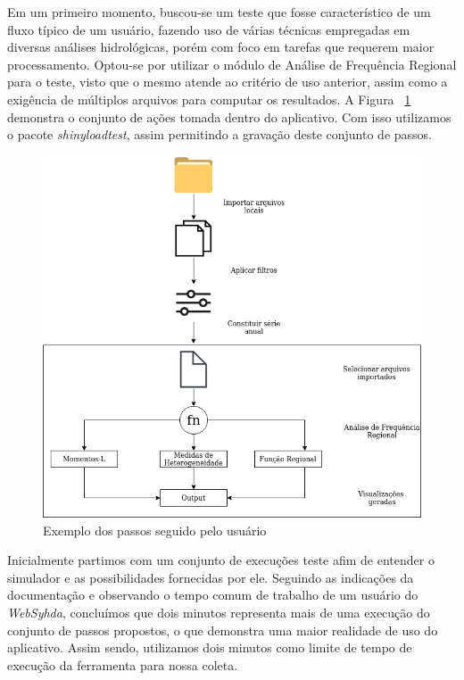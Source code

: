 \documentclass[12pt,english,brazil]{article}
\begin{document}
Em um primeiro momento, buscou-se um teste que fosse característico de um fluxo típico de um usuário, fazendo uso de várias técnicas empregadas em diversas análises hidrológicas, porém com foco em tarefas que requerem maior processamento. Optou-se por utilizar o módulo de Análise de Frequência Regional para o teste, visto que o mesmo atende ao critério de uso anterior, assim como a exigência de múltiplos arquivos para computar os resultados. A Figura ~\ref{usoWebSyhda} demonstra o conjunto de ações tomada dentro do aplicativo. Com isso utilizamos o pacote \emph{shinyloadtest}, assim permitindo a gravação deste conjunto de passos. 

\begin{figure}[htbp]
  \centering 
  \includegraphics[scale=.4]{paperWSCAD2021/figures/useWebSyhdaDrawio.png}
  \caption{Exemplo dos passos seguido pelo usuário}
  \label{usoWebSyhda}
\end{figure}

Inicialmente partimos com um conjunto de execuções teste afim de entender o simulador e as possibilidades fornecidas por ele. Seguindo as indicações da documentação e observando o tempo comum de trabalho de um usuário do \emph{WebSyhda}, concluímos que %
dois minutos representa mais de uma execução do conjunto de passos propostos, o que demonstra uma maior realidade de uso do aplicativo. Assim sendo, utilizamos dois minutos como limite de tempo de execução da ferramenta para nossa coleta.
\end{document}
